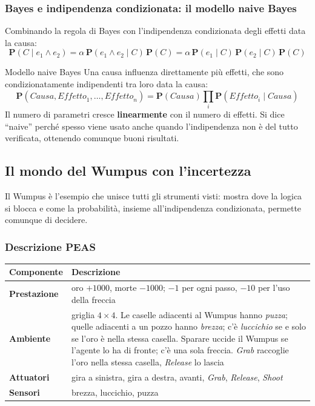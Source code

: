 \documentclass[11pt, a4paper]{article}
\renewcommand{\emph}[1]{\textcolor{verdechiaro}{\itshape #1}}
\newcommand{\intest}[1]{\textcolor{verde}{\sffamily\bfseries #1}}
\newcommand{\Pv}{\mathbf{P}}               %
\begin{document}
\subsubsection*{Bayes e indipendenza condizionata: il modello naive Bayes}

Combinando la regola di Bayes con l'indipendenza condizionata degli effetti data la causa:
\[
  \Pv(C \mid e_1 \land e_2) = \alpha\, \Pv(e_1 \land e_2 \mid C)\,\Pv(C) = \alpha\, \Pv(e_1 \mid C)\,\Pv(e_2 \mid C)\,\Pv(C)
\]

\begin{defbox}{Modello naive Bayes}
  Una causa influenza direttamente più effetti, che sono condizionatamente indipendenti tra loro data la causa:
  \[
    \Pv(\mathit{Causa}, \mathit{Effetto}_1, \dots, \mathit{Effetto}_n) = \Pv(\mathit{Causa}) \prod_{i} \Pv(\mathit{Effetto}_i \mid \mathit{Causa})
  \]
  Il numero di parametri cresce \textbf{linearmente} con il numero di effetti. Si dice ``naive'' perché spesso viene usato anche quando l'indipendenza non è del tutto verificata, ottenendo comunque buoni risultati.
\end{defbox}

\clearpage
\subsection{Il mondo del Wumpus con l'incertezza}

Il Wumpus è l'esempio che unisce tutti gli strumenti visti: mostra dove la logica si blocca e come la probabilità, insieme all'indipendenza condizionata, permette comunque di decidere.

\subsubsection*{Descrizione PEAS}

\begin{center}
  \renewcommand{\arraystretch}{1.35}
  \begin{tabular}{>{\bfseries}l p{11.2cm}}
    \toprule
    \intest{Componente} & \intest{Descrizione} \\
    \midrule
    Prestazione & oro $+1000$, morte $-1000$; $-1$ per ogni passo, $-10$ per l'uso della freccia \\
    Ambiente & griglia $4\times4$. Le caselle adiacenti al Wumpus hanno \emph{puzza}; quelle adiacenti a un pozzo hanno \emph{brezza}; c'è \emph{luccichio} se e solo se l'oro è nella stessa casella. Sparare uccide il Wumpus se l'agente lo ha di fronte; c'è una sola freccia. \emph{Grab} raccoglie l'oro nella stessa casella, \emph{Release} lo lascia \\
    Attuatori & gira a sinistra, gira a destra, avanti, \emph{Grab}, \emph{Release}, \emph{Shoot} \\
    Sensori & brezza, luccichio, puzza \\
    \bottomrule
  \end{tabular}
\end{center}
\end{document}
